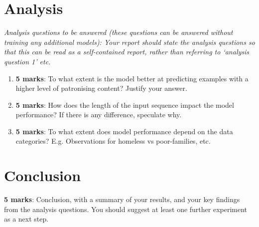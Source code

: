 \documentclass[11pt,a4paper]{article}
\begin{document}
\section{Analysis}

\emph{Analysis questions to be answered (these questions can be answered without training any additional models): Your report should state the analysis questions so that this can be read as a self-contained report, rather than referring to ‘analysis question 1’ etc.}

\begin{enumerate}
    \item \textbf{5 marks}: To what extent is the model better at predicting examples with a higher level of patronising content? Justify your answer.
    \item \textbf{5 marks}: How does the length of the input sequence impact the model performance? If there is any difference, speculate why.
    \item \textbf{5 marks}: To what extent does model performance depend on the data categories? E.g. Observations for homeless vs poor-families, etc.
\end{enumerate}

\section{Conclusion}

\textbf{5 marks}: Conclusion, with a summary of your results, and your key
findings from the analysis questions. You should suggest at least one further
experiment as a next step.



\end{document}
